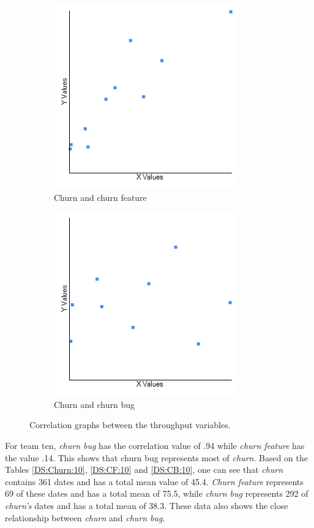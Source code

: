 \documentclass[UKenglish]{ifimaster}  %
\begin{document}
\begin{figure}[h] 
  \begin{subfigure}[b]{0.5\textwidth}
\includegraphics[scale=0.5]{Picture/Seven/ChrnvsChrnFT.png}
 \caption{Churn and churn feature} 
 \label{fig:a:7}
  \end{subfigure}
  \begin{subfigure}[b]{0.5\textwidth}
\includegraphics[scale=0.5]{Picture/Seven/ChrnvsChrnB.png}
 \caption{Churn and churn bug} 
\label{fig:b:7}
  \end{subfigure}
\caption{Correlation graphs between the throughput variables.}
\label{corr:Difference:7}
\end{figure}


For team ten, \textit{churn bug} has the correlation value of .94 while \textit{churn feature} has the value .14. This shows that churn bug represents most of \textit{churn}.  Based on the Tables \ref{DS:Churn:10}, \ref{DS:CF:10} and \ref{DS:CB:10}, one can see that \textit{churn} contains 361 dates and has a total mean value of 45.4. \textit{Churn feature} represents 69 of these dates and has a total mean of 75.5, while \textit{churn bug} represents 292 of \textit{churn's} dates and has a total mean of 38.3. These data also shows the close relationship between \textit{churn} and \textit{churn bug}.  
\end{document}
